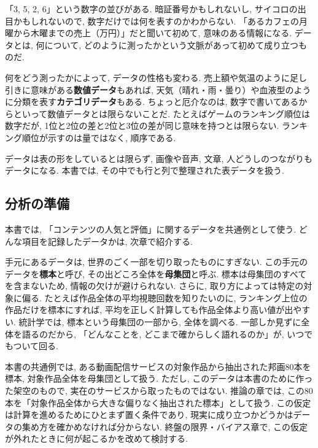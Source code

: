 \begin{tcolorbox}[
  colback=gray!5,
  colframe=gray!50,
  arc=4mm,
  boxrule=0.5pt,
  title={\textbf{コラム：データとは何か}},
  fonttitle=\large
]

「3, 5, 2, 6」という数字の並びがある.
暗証番号かもしれないし, サイコロの出目かもしれないので, 数字だけでは何を表すのかわからない.
「あるカフェの月曜から木曜までの売上（万円）」だと聞いて初めて, 意味のある情報になる.
データとは, 何について, どのように測ったかという文脈があって初めて成り立つものだ.

何をどう測ったかによって, データの性格も変わる.
売上額や気温のように足し引きに意味がある\textbf{数値データ}もあれば,
天気（晴れ・雨・曇り）や血液型のように分類を表す\textbf{カテゴリデータ}もある.
ちょっと厄介なのは, 数字で書いてあるからといって数値データとは限らないことだ.
たとえばゲームのランキング順位は数字だが, 1位と2位の差と2位と3位の差が同じ意味を持つとは限らない.
ランキング順位が示すのは量ではなく, 順序である.

データは表の形をしているとは限らず, 画像や音声, 文章, 人どうしのつながりもデータになる.
本書では, その中でも行と列で整理された表データを扱う.

\end{tcolorbox}

  \subsection{分析の準備}

    本書では, 「コンテンツの人気と評価」に関するデータを共通例として使う.
    どんな項目を記録したデータかは, 次章で紹介する.

    手元にあるデータは, 世界のごく一部を切り取ったものにすぎない.
    この手元のデータを\textbf{標本}と呼び, その出どころ全体を\textbf{母集団}と呼ぶ.
    標本は母集団のすべてを含まないため, 情報の欠けが避けられない.
    さらに, 取り方によっては特定の対象に偏る.
    たとえば作品全体の平均視聴回数を知りたいのに, ランキング上位の作品だけを標本にすれば, 平均を正しく計算しても作品全体より高い値が出やすい.
    統計学では, 標本という母集団の一部から, 全体を調べる.
    一部しか見ずに全体を語るのだから, 「どんなことを, どこまで確からしく語れるのか」が, いつでもついて回る.

    本書の共通例では, ある動画配信サービスの対象作品から抽出された邦画80本を標本, 対象作品全体を母集団として扱う.
    ただし, このデータは本書のために作った架空のもので, 実在のサービスから取ったものではない.
    推論の章では, この80本を「対象作品全体から大きな偏りなく抽出された標本」として扱う.
    この仮定は計算を進めるためにひとまず置く条件であり, 現実に成り立つかどうかはデータの集め方を確かめなければ分からない.
    終盤の限界・バイアス章で, この仮定が外れたときに何が起こるかを改めて検討する.

